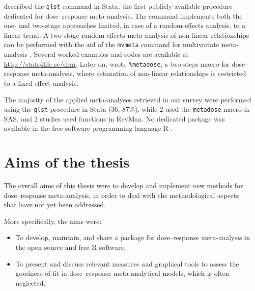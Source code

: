 \documentclass[11pt,a4paper,twoside,openany]{book}\usepackage{knitr}
\begin{document}
{{\cite{orsini2006generalized} described the \texttt{glst} command in Stata, the first publicly available procedure dedicated for dose--response meta-analysis. The command implements both the one- and two-stage approaches limited, in case of a random-effects analysis, to a linear trend. A two-stage random-effects meta-analysis of non-linear relationships can be performed with the aid of the \texttt{mvmeta} command for multivariate meta-analysis \citep{white2011multivariate}. Several worked examples and codes are available at \url{http://stats4life.se/drm}. Later on, \cite{li2010sas} wrote \texttt{\%metadose}, a two-steps macro for dose--response meta-analysis, where estimation of non-linear relationships is restricted to a fixed-effect analysis.

The majority of the applied meta-analyses retrieved in our survey were performed using the \texttt{glst} procedure in Stata (36, 87\%), while 2 used the \texttt{metadose} macro in SAS, and 2 studies used functions in RevMan. No dedicated package was available in the free software programming language \textsf{R} \citep{Rcit}. 




%

\chapter{Aims of the thesis}

The overall aims of this thesis were to develop and implement new methods for dose--response meta-analysis, in order to deal with the methodological aspects that have not yet been addressed.

\bigskip

More specifically, the aims were:

\begin{itemize}
\item To develop, maintain, and share a package for dose--response meta-analysis in the open source and free \textsf{R} software.

\item To present and discuss relevant measures and graphical tools to assess the goodness-of-fit in dose--response meta-analytical models, which is often neglected.


\end{itemize}}}
\end{document}
